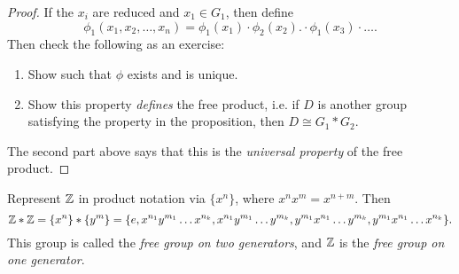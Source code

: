 \begin{proof}
  If the $x_i$ are reduced and $x_1 \in G_1$, then define
  \[
    \phi_1(x_1, x_2, \dots, x_n) = \phi_1(x_1) \cdot \phi_2(x_2) .\cdot \phi_1(x_3) \cdot \dots.
  \]
  Then check the following as an exercise:
  \begin{enumerate}
    \item Show such that $\phi$ exists and is unique.
    \item Show this property \emph{defines} the
      free product, i.e. if $D$ is another group
      satisfying the property in the proposition, then
      $D \cong G_1 * G_2$.
  \end{enumerate}
  The second part above says that this is
  the \emph{universal property} of the free product.
\end{proof}

\begin{example}
  Represent $\mathbb{Z}$ in product notation via $\{x^n\}$, where
  $x^n x^m = x^{n + m}$. Then
  \[
    \mathbb{Z} * \mathbb{Z} = \{x^n\} * \{y^m\}
    = \{e,
      x^{n_1} y^{m_1} \dots x^{n_k},
      x^{n_1} y^{m_1} \dots y^{m_k},
      y^{m_1} x^{n_1} \dots y^{m_k},
      y^{m_1} x^{n_1} \dots x^{n_k}
    \}.
  \]
  This group is called the \emph{free group on
  two generators}, and $\mathbb{Z}$ is the
  \emph{free group on one generator}.
\end{example}
